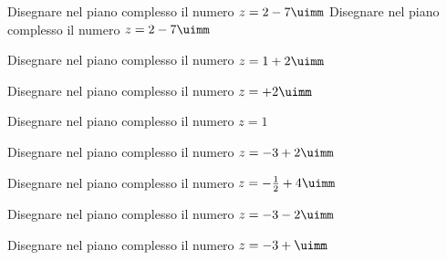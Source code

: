   \begin{exercise}
Disegnare nel piano complesso il numero $z=2-7\uimm$
	\tcblower
Disegnare nel piano complesso il numero $z=2-7\uimm$
	\begin{center}
		
		\label{fig:disegnopianocomplesso12}
	\end{center}
\end{exercise}
\begin{exercise}[no solution]
	Disegnare nel piano complesso il numero $z=1+2\uimm$
\end{exercise}
\begin{exercise}[no solution]
Disegnare nel piano complesso il numero $z=+2\uimm$
\end{exercise}
\begin{exercise}[no solution]
	Disegnare nel piano complesso il numero $z=1$
\end{exercise}
\begin{exercise}[no solution]
	Disegnare nel piano complesso il numero $z=-3+2\uimm$
\end{exercise}
\begin{exercise}[no solution]
	Disegnare nel piano complesso il numero $z=-\frac{1}{2}+4\uimm$
\end{exercise}
\begin{exercise}[no solution]
	Disegnare nel piano complesso il numero $z=-3-2\uimm$
\end{exercise}
\begin{exercise}[no solution]
	Disegnare nel piano complesso il numero $z=-3+\uimm$
\end{exercise}


